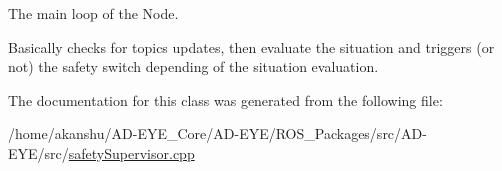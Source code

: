 The main loop of the Node. 

Basically checks for topics updates, then evaluate the situation and triggers (or not) the safety switch depending of the situation evaluation. 

The documentation for this class was generated from the following file\+:\begin{DoxyCompactItemize}
\item 
/home/akanshu/\+A\+D-\/\+E\+Y\+E\+\_\+\+Core/\+A\+D-\/\+E\+Y\+E/\+R\+O\+S\+\_\+\+Packages/src/\+A\+D-\/\+E\+Y\+E/src/\hyperlink{safetySupervisor_8cpp}{safety\+Supervisor.\+cpp}\end{DoxyCompactItemize}
